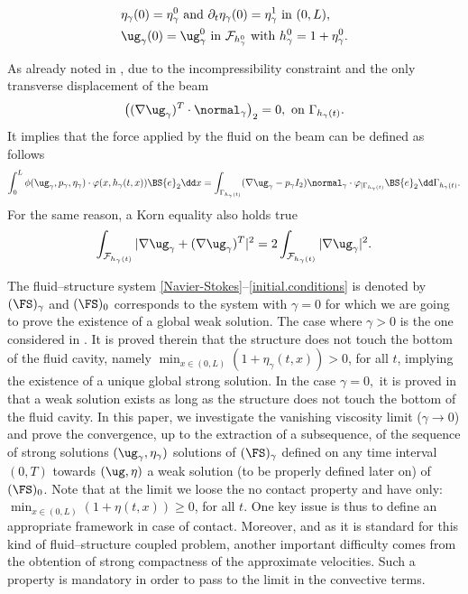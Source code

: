 \begin{equation}\label{initial.conditions}
\begin{aligned}
&\eta_{\gamma}(0)=\eta^{0}_\gamma\text{ and }\partial_{t}\eta_{\gamma}(0)=\eta_\gamma^{1}\text{ in }(0,L),\\
&\ug_{\gamma}(0)=\ug_\gamma^{0}\text{ in }\mathcal{F}_{h_\gamma^{0}}\text{ with }h_\gamma^{0}=1+\eta_\gamma^{0}.
\end{aligned}
\end{equation}
\begin{remark}\label{rem:korn}
As already noted in \cite{Chambolle-etal}, due to the incompressibility constraint and the only transverse displacement of the beam
\[
\left((\nabla \ug_\gamma)^T\cdot\normal_\gamma\right)_2=0, \text{ on }\Gamma_{h_{\gamma}(t)}.
\]
It implies that the force applied by the fluid on the beam can be defined as follows
\[
\int_{0}^{L}\phi(\ug_{\gamma},p_{\gamma},\eta_{\gamma})\cdot \varphi(x,h_{\gamma}(t,x))\BS{e}_{2}\dd x=\int_{\Gamma_{h_{\gamma}(t)}}(\nabla\ug_{\gamma}-p_{\gamma}I_2)\normal_{\gamma}\cdot \varphi_{\vert\Gamma_{h_{\gamma}(t)}}\BS{e}_{2}\dd\Gamma_{h_{\gamma}(t)}.
\]
For the same reason, a Korn equality also holds true
\[
\int_{\mathcal{F}_{h_\gamma(t)}} \vert\nabla\ug_{\gamma} +( \nabla\ug_{\gamma})^{T}\vert^2 =2\int_{\mathcal{F}_{h_\gamma(t)}} \vert\nabla\ug_{\gamma} \vert^2.
\]
\end{remark}

The fluid--structure system \eqref{Navier-Stokes}--\eqref{initial.conditions} is denoted by $(\FS)_{\gamma}$ and $(\FS)_0$ corresponds to the system with $\gamma=0$ for which we are going to prove the existence of a global weak solution.
The case where $\gamma>0$ is the one considered in \cite{Grandmont-Hillairet}. It is proved therein that the structure does not touch the bottom of the fluid cavity, namely $\min_{x\in (0, L)}(1+\eta_\gamma(t, x)) >0$, for all $t$, implying the existence of a unique global strong solution. In the case $\gamma=0,$ it is proved in \cite{Grandmont08, Muha-Canic13} that a weak solution exists as long as the structure does not touch the bottom of the fluid cavity. In this paper, we investigate the vanishing viscosity limit (\ie $\gamma\to 0$) and prove the convergence, up to the extraction of a subsequence, of the sequence of strong solutions $(\ug_\gamma,\eta_\gamma)$ solutions of $(\FS)_{\gamma}$ defined on any time interval $(0, T)$ towards $(\ug, \eta)$ a weak solution (to be properly defined later on) of $(\FS)_0$. Note that at the limit we loose the no contact property and have only: $\min_{x\in (0, L)}(1+\eta(t, x))\geq 0$, for all $t$. One key issue is thus to define an appropriate framework in case of contact. Moreover, and as it is standard for this kind of fluid--structure coupled problem, another important difficulty comes from the obtention of strong compactness of the approximate velocities. Such a property is mandatory in order to pass to the limit in the convective terms.
 
